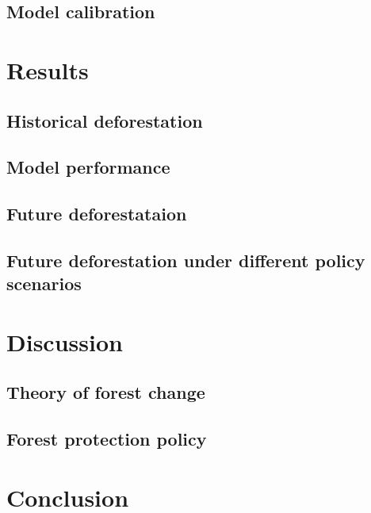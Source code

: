 \documentclass[
]{article}
\begin{document}
\hypertarget{model-calibration}{%
\subsection{Model calibration}\label{model-calibration}}

\hypertarget{results}{%
\section{Results}\label{results}}

\hypertarget{historical-deforestation}{%
\subsection{Historical deforestation}\label{historical-deforestation}}

\hypertarget{model-performance}{%
\subsection{Model performance}\label{model-performance}}

\hypertarget{future-deforestataion}{%
\subsection{Future deforestataion}\label{future-deforestataion}}

\hypertarget{future-deforestation-under-different-policy-scenarios}{%
\subsection{Future deforestation under different policy scenarios}\label{future-deforestation-under-different-policy-scenarios}}

\hypertarget{discussion}{%
\section{Discussion}\label{discussion}}

\hypertarget{theory-of-forest-change}{%
\subsection{Theory of forest change}\label{theory-of-forest-change}}

\hypertarget{forest-protection-policy}{%
\subsection{Forest protection policy}\label{forest-protection-policy}}

\hypertarget{conclusion}{%
\section{Conclusion}\label{conclusion}}
\end{document}
